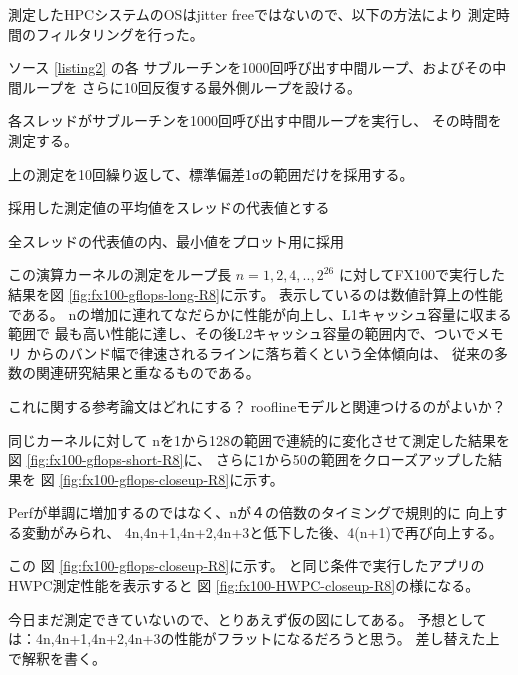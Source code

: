 \documentclass[submit,techrep,noauthor]{ipsj}
\begin{document}
測定したHPCシステムのOSはjitter freeではないので、以下の方法により
測定時間のフィルタリングを行った。

ソース \lstlistingname \ref{listing2} の各
サブルーチンを1000回呼び出す中間ループ、およびその中間ループを
さらに10回反復する最外側ループを設ける。
\begin{itemize}
{
\item {各スレッドがサブルーチンを1000回呼び出す中間ループを実行し、
		その時間を測定する。}
\item {上の測定を10回繰り返して、標準偏差1σの範囲だけを採用する。}
\item {採用した測定値の平均値をスレッドの代表値とする}
\item {全スレッドの代表値の内、最小値をプロット用に採用}
}
\end{itemize}


この演算カーネルの測定をループ長
\begin{math}
n=1,2,4,..,2^{26}
\end{math}
に対してFX100で実行した結果を図 \ref{fig:fx100-gflops-long-R8}に示す。
表示しているのは数値計算上の性能である。
nの増加に連れてなだらかに性能が向上し、L1キャッシュ容量に収まる範囲で
最も高い性能に達し、その後L2キャッシュ容量の範囲内で、ついでメモリ
からのバンド幅で律速されるラインに落ち着くという全体傾向は、
従来の多数の関連研究結果と重なるものである。

{\color{blue} \par
これに関する参考論文はどれにする？
rooflineモデルと関連つけるのがよいか？
} \par

同じカーネルに対して
nを1から128の範囲で連続的に変化させて測定した結果を
図 \ref{fig:fx100-gflops-short-R8}に、
さらに1から50の範囲をクローズアップした結果を
図 \ref{fig:fx100-gflops-closeup-R8}に示す。

Perfが単調に増加するのではなく、nが４の倍数のタイミングで規則的に
向上する変動がみられ、
4n,4n+1,4n+2,4n+3と低下した後、4(n+1)で再び向上する。

この
図 \ref{fig:fx100-gflops-closeup-R8}に示す。
と同じ条件で実行したアプリのHWPC測定性能を表示すると
図 \ref{fig:fx100-HWPC-closeup-R8}の様になる。

{\color{blue} \par
今日まだ測定できていないので、とりあえず仮の図にしてある。
予想としては：4n,4n+1,4n+2,4n+3の性能がフラットになるだろうと思う。
差し替えた上で解釈を書く。

} \par
\end{document}
